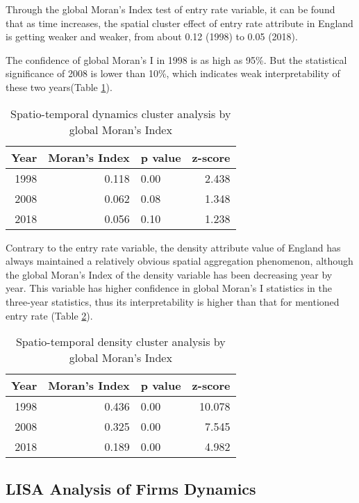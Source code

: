 \documentclass[
  12pt,
  oneside]{book}
\begin{document}
Through the global Moran's Index test of entry rate variable, it can be found that as time increases, the spatial cluster effect of entry rate attribute in England is getting weaker and weaker, from about 0.12 (1998) to 0.05 (2018).

The confidence of global Moran's I in 1998 is as high as 95\%. But the statistical significance of 2008 is lower than 10\%, which indicates weak interpretability of these two years(Table \ref{tab:tab-morans-i-enR}).

\begin{table}

\caption{\label{tab:tab-morans-i-enR}Spatio-temporal dynamics cluster analysis by global Moran's Index}
\centering
\begin{tabular}[t]{rrlr}
\toprule
\textbf{Year} & \textbf{Moran’s Index} & \textbf{p value} & \textbf{z-score}\\
\midrule
1998 & 0.118 & 0.00 & 2.438\\
2008 & 0.062 & 0.08 & 1.348\\
2018 & 0.056 & 0.10 & 1.238\\
\bottomrule
\end{tabular}
\end{table}

Contrary to the entry rate variable, the density attribute value of England has always maintained a relatively obvious spatial aggregation phenomenon, although the global Moran's Index of the density variable has been decreasing year by year. This variable has higher confidence in global Moran's I statistics in the three-year statistics, thus its interpretability is higher than that for mentioned entry rate (Table \ref{tab:tab-morans-i-den}).

\begin{table}

\caption{\label{tab:tab-morans-i-den}Spatio-temporal density cluster analysis by global Moran's Index}
\centering
\begin{tabular}[t]{rrlr}
\toprule
\textbf{Year} & \textbf{Moran’s Index} & \textbf{p value} & \textbf{z-score}\\
\midrule
1998 & 0.436 & 0.00 & 10.078\\
2008 & 0.325 & 0.00 & 7.545\\
2018 & 0.189 & 0.00 & 4.982\\
\bottomrule
\end{tabular}
\end{table}

\hypertarget{lisa-analysis-of-firms-dynamics}{%
\subsection{LISA Analysis of Firms Dynamics}\label{lisa-analysis-of-firms-dynamics}}
\end{document}
